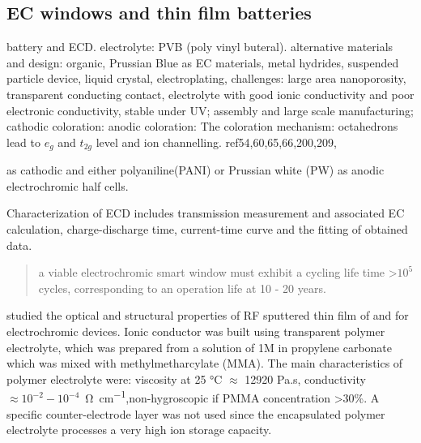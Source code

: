 \subsection{EC windows and thin film batteries}

battery and ECD.\cite{Granqvist2012} electrolyte: PVB (poly vinyl buteral).
alternative materials and design: organic, Prussian Blue as EC materials, metal hydrides, suspended particle device, liquid crystal, electroplating,
challenges: large area nanoporosity, transparent conducting contact, electrolyte with good ionic conductivity and poor electronic conductivity, stable under UV; assembly and large scale manufacturing;
cathodic coloration:
anodic coloration:
The coloration mechanism:  octahedrons lead to $e_g$ and $t_{2g}$ level and ion channelling.
ref54,60,65,66,200,209,


 as cathodic and either polyaniline(PANI) or Prussian white (PW) as anodic electrochromic half cells. \cite{Heckner2002}

Characterization of ECD includes transmission measurement and associated EC calculation, charge-discharge time, current-time curve and the fitting of obtained data.

\begin{quote}
a viable electrochromic smart window must exhibit a cycling life time \textgreater $10^5$ cycles, corresponding to an operation life at 10 - 20 years.
\end{quote}


\citeauthor{Sella1998} studied the optical and structural properties of RF sputtered thin film of  and  for electrochromic devices. Ionic conductor was built using transparent polymer electrolyte, which was prepared from a solution of 1M  in propylene carbonate which was mixed with methylmetharcylate (MMA). The main characteristics of polymer electrolyte were: viscosity at 25 \si{\degreeCelsius} $\approx$ 12920 Pa.s, conductivity $\approx 10^{-2}-10^{-4}$\si{\per\ohm\per cm},non-hygroscopic if PMMA concentration \textgreater 30\%. A specific counter-electrode layer was not used since the encapsulated polymer electrolyte processes a very high ion storage capacity.\cite{Sella1998}